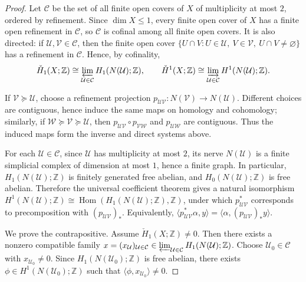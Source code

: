 \documentclass[12pt,oneside,a4paper]{article}
\theoremstyle{mytheorem}
\theoremstyle{remark}
\theoremstyle{definition}
\begin{document}
\begin{proof}
Let \(\mathcal C\) be the set of all finite open covers of \(X\) of multiplicity
at most \(2\), ordered by refinement. Since \(\dim X\le 1\), every finite open
cover of \(X\) has a finite open refinement in \(\mathcal C\), so \(\mathcal C\)
is cofinal among all finite open covers. It is also directed: if
\(\mathcal U,\mathcal V\in\mathcal C\), then the finite open cover
\(\{U\cap V: U\in\mathcal U,\ V\in\mathcal V,\ U\cap V\neq\varnothing\}\)
has a refinement in \(\mathcal C\).
Hence, by cofinality,
\[
\check H_1(X;\mathbb Z)\cong
\varprojlim_{\mathcal U\in\mathcal C} H_1(N(\mathcal U);\mathbb Z),
\qquad
\check H^1(X;\mathbb Z)\cong
\varinjlim_{\mathcal U\in\mathcal C} H^1(N(\mathcal U);\mathbb Z).
\]

If \(\mathcal V\succeq\mathcal U\), choose a refinement projection
\(p_{\mathcal U\mathcal V}\colon N(\mathcal V)\to N(\mathcal U)\). Different
choices are contiguous, hence induce the same maps on homology and cohomology;
similarly, if \(\mathcal W\succeq\mathcal V\succeq\mathcal U\), then
\(p_{\mathcal U\mathcal V}\circ p_{\mathcal V\mathcal W}\) and
\(p_{\mathcal U\mathcal W}\) are contiguous. Thus the induced maps form the
inverse and direct systems above.

For each \(\mathcal U\in\mathcal C\), since \(\mathcal U\) has multiplicity at most \(2\), its nerve \(N(\mathcal U)\) is a finite simplicial complex of dimension at most \(1\), hence a finite graph. In particular, \(H_1(N(\mathcal U);\mathbb Z)\) is finitely generated free abelian, and \(H_0(N(\mathcal U);\mathbb Z)\) is free abelian. Therefore the universal coefficient theorem gives a natural
isomorphism
\(H^1(N(\mathcal U);\mathbb Z)\cong
\operatorname{Hom}(H_1(N(\mathcal U);\mathbb Z),\mathbb Z)\),
under which
\(p_{\mathcal U\mathcal V}^*\) corresponds to precomposition with
\((p_{\mathcal U\mathcal V})_*\). Equivalently,
\(\langle p_{\mathcal U\mathcal V}^*\alpha,y\rangle
=
\langle \alpha,(p_{\mathcal U\mathcal V})_*y\rangle\).

We prove the contrapositive. Assume \(\check H_1(X;\mathbb Z)\neq 0\). Then
there exists a nonzero compatible family
\(x=(x_{\mathcal U})_{\mathcal U\in\mathcal C}
\in
\varprojlim_{\mathcal U\in\mathcal C} H_1(N(\mathcal U);\mathbb Z)\).
Choose \(\mathcal U_0\in\mathcal C\) with \(x_{\mathcal U_0}\neq 0\). Since
\(H_1(N(\mathcal U_0);\mathbb Z)\) is free abelian, there exists
\(\phi\in H^1(N(\mathcal U_0);\mathbb Z)\) such that
\(\langle \phi,x_{\mathcal U_0}\rangle\neq0.\)


\end{proof}
\end{document}
